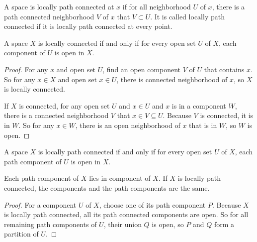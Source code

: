 \begin{definition}
    A space is locally path connected at $x$ if for all neighborhood $U$ of $x$, there is a path connected neighborhood $V$ of $x$ that $V \subset U$. It is called locally path connected if it is locally path connected at every point.
\end{definition}

\begin{theorem}
A space $X$ is locally connected if and only if for every open set $U$ of $X$, each component of $U$ is open in $X$.    
\end{theorem}
\begin{proof}
    For any $x$ and open set $U$, find an open component $V$ of $U$ that contains $x$. So for any $x \in X$ and open set $x \in U$, there is connected neighborhood of $x$, so $X$ is locally connected.
    
    If $X$ is connected, for any open set $U$ and $x \in U$ and $x$ is in a component $W$, there is a connected neighborhood $V$ that $x \in V \subseteq U$. Because $V$ is connected, it is in $W$. So for any $x \in W$, there is an open neighborhood of $x$ that is in $W$, so $W$ is open.
\end{proof}

\begin{theorem}
A space $X$ is locally path connected if and only if for every open set $U$ of $X$, each path component of $U$ is open in $X$.    
\end{theorem}

\begin{theorem}
    Each path component of $X$ lies in component of $X$. If $X$ is locally path connected, the components and the path components are the same.    
\end{theorem}
\begin{proof}
    For a component $U$ of $X$, choose one of its path component $P$. Because $X$ is locally path connected, all its path connected components are open. So for all remaining path components of $U$, their union $Q$ is open, so $P$ and $Q$ form a partition of $U$.
\end{proof}
















